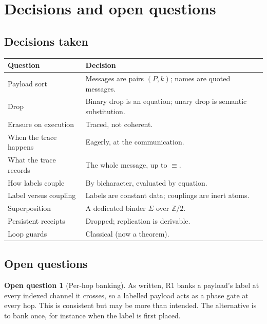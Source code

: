 \documentclass[11pt,a4paper]{article}
\theoremstyle{plain}
\theoremstyle{definition}
\newtheorem{question}[theorem]{Open question}
\theoremstyle{remark}
\newcommand{\Zt}{\mathbb{Z}/2}
\newcommand{\scong}{\equiv}
\begin{document}
\section{Decisions and open questions}\label{sec:open}

\subsection{Decisions taken}

\begin{center}
\begin{tabular}{@{}p{}p{}@{}}
\toprule
\textbf{Question} & \textbf{Decision}\\
\midrule
Payload sort & Messages are pairs $(P,k)$; names are quoted messages.\\
Drop & Binary drop is an equation; unary drop is semantic substitution.\\
Erasure on execution & Traced, not coherent.\\
When the trace happens & Eagerly, at the communication.\\
What the trace records & The whole message, up to $\scong$.\\
How labels couple & By bicharacter, evaluated by equation.\\
Label versus coupling & Labels are constant data; couplings are inert atoms.\\
Superposition & A dedicated binder $\Sigma$ over $\Zt$.\\
Persistent receipts & Dropped; replication is derivable.\\
Loop guards & Classical (now a theorem).\\
\bottomrule
\end{tabular}
\end{center}

\subsection{Open questions}

\begin{question}[Per-hop banking]\label{q:hop}
As written, R1 banks a payload's label at every indexed channel it crosses, so
a labelled payload acts as a phase gate at every hop. This is consistent but
may be more than intended. The alternative is to bank once, for instance when
the label is first placed.
\end{question}
\end{document}
